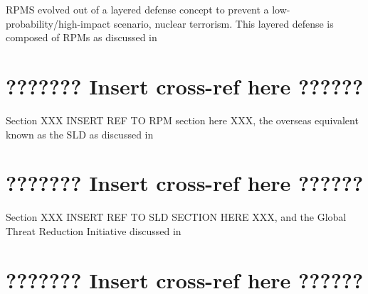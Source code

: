 \documentclass{report}
\begin{document}
RPMS evolved out of a layered defense concept to prevent a low-probability/high-impact scenario, nuclear terrorism. This layered defense is composed of RPMs as discussed in 

\section{??????? Insert cross-ref here ??????}

Section XXX INSERT REF TO RPM section here XXX, the overseas equivalent known as the SLD as discussed in 

\section{??????? Insert cross-ref here ??????}


Section XXX INSERT REF TO SLD SECTION HERE XXX, and the Global Threat Reduction Initiative discussed in 

\section{??????? Insert cross-ref here ??????}
\end{document}
